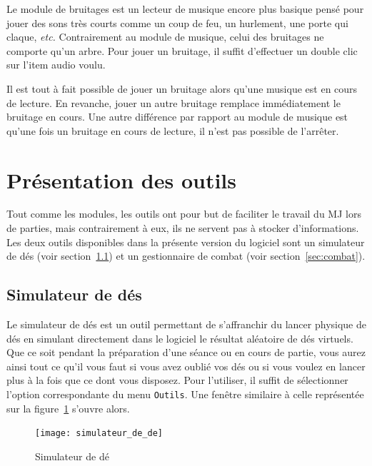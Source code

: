 \documentclass[a4paper,12pt]{article}
\newcommand*{\interfaceitem}[1]{\texttt{#1}}
\begin{document}
Le module de bruitages est un lecteur de musique encore plus basique pensé pour jouer des sons très courts comme un coup de feu, un hurlement, une porte qui claque, \emph{etc.}
Contrairement au module de musique, celui des bruitages ne comporte qu'un arbre.
Pour jouer un bruitage, il suffit d'effectuer un double clic sur l'item audio voulu.

Il est tout à fait possible de jouer un bruitage alors qu'une musique est en cours de lecture.
En revanche, jouer un autre bruitage remplace immédiatement le bruitage en cours.
Une autre différence par rapport au module de musique est qu'une fois un bruitage en cours de lecture, il n'est pas possible de l'arrêter.

\section{Présentation des outils}
\label{sec:outils}

Tout comme les modules, les outils ont pour but de faciliter le travail du MJ lors de parties, mais contrairement à eux, ils ne servent pas à stocker d'informations.
Les deux outils disponibles dans la présente version du logiciel sont un simulateur de dés (voir section~\ref{sec:des}) et un gestionnaire de combat (voir section~\ref{sec:combat}).

\subsection{Simulateur de dés}
\label{sec:des}

Le simulateur de dés est un outil permettant de s'affranchir du lancer physique de dés en simulant directement dans le logiciel le résultat aléatoire de dés virtuels.
Que ce soit pendant la préparation d'une séance ou en cours de partie, vous aurez ainsi tout ce qu'il vous faut si vous avez oublié vos dés ou si vous voulez en lancer plus à la fois que ce dont vous disposez.
Pour l'utiliser, il suffit de sélectionner l'option correspondante du menu \interfaceitem{Outils}.
Une fenêtre similaire à celle représentée sur la figure~\ref{simulateur_de} s'ouvre alors.
\begin{figure}[h]
    \texttt{[image: simulateur\_de\_de]}
    \caption{Simulateur de dé}
    \label{simulateur_de}
\end{figure}
\end{document}
